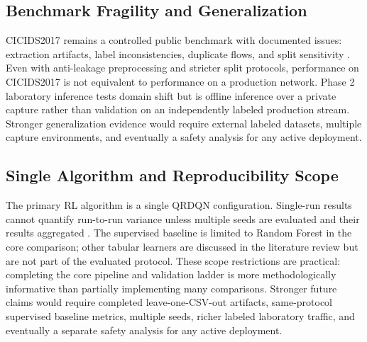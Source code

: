 \subsection{Benchmark Fragility and Generalization}
CICIDS2017 remains a controlled public benchmark with documented issues: extraction artifacts, label inconsistencies, duplicate flows, and split sensitivity \parencite{Engelen2021CICIDSIssues,Lanvin2023Errors,Liu2022ErrorPrevalenceNIDS}. Even with anti-leakage preprocessing and stricter split protocols, performance on CICIDS2017 is not equivalent to performance on a production network. Phase 2 laboratory inference tests domain shift but is offline inference over a private capture rather than validation on an independently labeled production stream. Stronger generalization evidence would require external labeled datasets, multiple capture environments, and eventually a safety analysis for any active deployment.

\subsection{Single Algorithm and Reproducibility Scope}
The primary RL algorithm is a single QRDQN configuration. Single-run results cannot quantify run-to-run variance unless multiple seeds are evaluated and their results aggregated \parencite{SuttonBarto2018RL}. The supervised baseline is limited to Random Forest in the core comparison; other tabular learners are discussed in the literature review but are not part of the evaluated protocol. These scope restrictions are practical: completing the core pipeline and validation ladder is more methodologically informative than partially implementing many comparisons. Stronger future claims would require completed leave-one-CSV-out artifacts, same-protocol supervised baseline metrics, multiple seeds, richer labeled laboratory traffic, and eventually a separate safety analysis for any active deployment.
